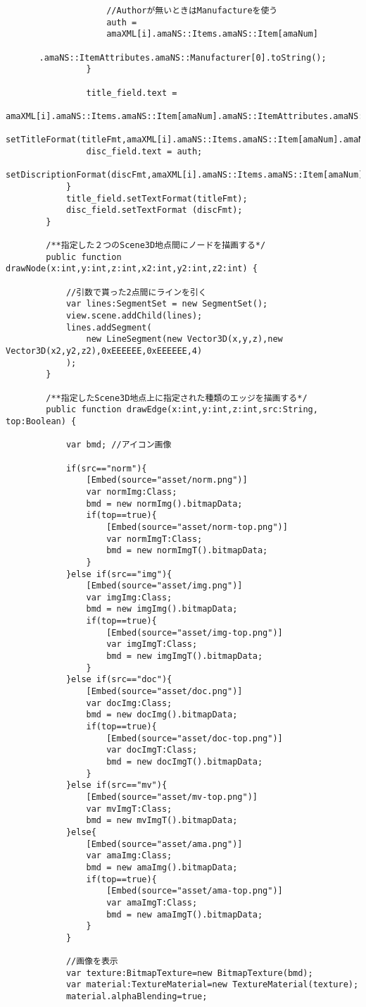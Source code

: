 {\begin{verbatim}
					//Authorが無いときはManufactureを使う
					auth = 
					amaXML[i].amaNS::Items.amaNS::Item[amaNum]
					　　　　.amaNS::ItemAttributes.amaNS::Manufacturer[0].toString();
				}
				
				title_field.text =
				amaXML[i].amaNS::Items.amaNS::Item[amaNum].amaNS::ItemAttributes.amaNS::Title.toString();
				setTitleFormat(titleFmt,amaXML[i].amaNS::Items.amaNS::Item[amaNum].amaNS::DetailPageURL);
				disc_field.text = auth;
				setDiscriptionFormat(discFmt,amaXML[i].amaNS::Items.amaNS::Item[amaNum].amaNS::DetailPageURL);
			}
			title_field.setTextFormat(titleFmt);
			disc_field.setTextFormat (discFmt);
		}

		/**指定した２つのScene3D地点間にノードを描画する*/
		public function drawNode(x:int,y:int,z:int,x2:int,y2:int,z2:int) {
			
			//引数で貰った2点間にラインを引く
			var lines:SegmentSet = new SegmentSet();
			view.scene.addChild(lines);
			lines.addSegment(
				new LineSegment(new Vector3D(x,y,z),new Vector3D(x2,y2,z2),0xEEEEEE,0xEEEEEE,4)
			);
		}

		/**指定したScene3D地点上に指定された種類のエッジを描画する*/
		public function drawEdge(x:int,y:int,z:int,src:String, top:Boolean) {
			
			var bmd; //アイコン画像
			
			if(src=="norm"){
				[Embed(source="asset/norm.png")]
				var normImg:Class;
				bmd = new normImg().bitmapData;
				if(top==true){
					[Embed(source="asset/norm-top.png")]
					var normImgT:Class;
					bmd = new normImgT().bitmapData;
				}
			}else if(src=="img"){
				[Embed(source="asset/img.png")]
				var imgImg:Class;
				bmd = new imgImg().bitmapData;
				if(top==true){
					[Embed(source="asset/img-top.png")]
					var imgImgT:Class;
					bmd = new imgImgT().bitmapData;
				}
			}else if(src=="doc"){
				[Embed(source="asset/doc.png")]
				var docImg:Class;
				bmd = new docImg().bitmapData;
				if(top==true){
					[Embed(source="asset/doc-top.png")]
					var docImgT:Class;
					bmd = new docImgT().bitmapData;
				}
			}else if(src=="mv"){
				[Embed(source="asset/mv-top.png")]
				var mvImgT:Class;
				bmd = new mvImgT().bitmapData;
			}else{
				[Embed(source="asset/ama.png")]
				var amaImg:Class;
				bmd = new amaImg().bitmapData;
				if(top==true){
					[Embed(source="asset/ama-top.png")]
					var amaImgT:Class;
					bmd = new amaImgT().bitmapData;
				}
			}
					
			//画像を表示
			var texture:BitmapTexture=new BitmapTexture(bmd);
			var material:TextureMaterial=new TextureMaterial(texture);
			material.alphaBlending=true;
				

\end{verbatim}}
